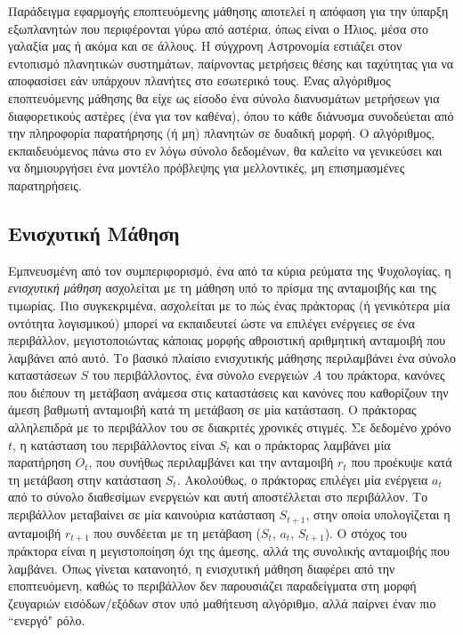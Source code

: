 Παράδειγμα εφαρμογής εποπτευόμενης μάθησης αποτελεί η απόφαση για την ύπαρξη εξωπλανητών που περιφέρονται γύρω από αστέρια, όπως είναι ο Ήλιος, μέσα στο γαλαξία μας ή ακόμα και σε άλλους. Η σύγχρονη Αστρονομία εστιάζει στον εντοπισμό πλανητικών συστημάτων, παίρνοντας μετρήσεις θέσης και ταχύτητας για να αποφασίσει εάν υπάρχουν πλανήτες στο εσωτερικό τους. Ένας αλγόριθμος εποπτευόμενης μάθησης θα είχε ως είσοδο ένα σύνολο διανυσμάτων μετρήσεων για διαφορετικούς αστέρες (ένα για τον καθένα), όπου το κάθε διάνυσμα συνοδεύεται από την πληροφορία παρατήρησης (ή μη) πλανητών σε δυαδική μορφή. Ο αλγόριθμος, εκπαιδευόμενος πάνω στο εν λόγω σύνολο δεδομένων, θα καλείτο να γενικεύσει και να δημιουργήσει ένα μοντέλο πρόβλεψης για μελλοντικές, μη επισημασμένες παρατηρήσεις.


\subsection{Ενισχυτική Μάθηση}
Εμπνευσμένη από τον συμπεριφορισμό, ένα από τα κύρια ρεύματα της Ψυχολογίας, η \emph{ενισχυτική μάθηση} ασχολείται με τη μάθηση υπό το πρίσμα της ανταμοιβής και της τιμωρίας. Πιο συγκεκριμένα, ασχολείται με το πώς ένας πράκτορας (ή γενικότερα μία οντότητα λογισμικού) μπορεί να εκπαιδευτεί ώστε να επιλέγει ενέργειες  σε ένα περιβάλλον, μεγιστοποιώντας κάποιας μορφής αθροιστική αριθμητική ανταμοιβή που λαμβάνει από αυτό. 
Το βασικό πλαίσιο ενισχυτικής μάθησης περιλαμβάνει ένα σύνολο καταστάσεων $S$ του περιβάλλοντος, ένα σύνολο ενεργειών $A$ του πράκτορα, κανόνες που διέπουν τη μετάβαση ανάμεσα στις καταστάσεις και κανόνες που καθορίζουν την άμεση βαθμωτή ανταμοιβή κατά τη μετάβαση σε μία κατάσταση. Ο πράκτορας αλληλεπιδρά με το περιβάλλον του σε διακριτές χρονικές στιγμές. Σε δεδομένο χρόνο $t$, η κατάσταση του περιβάλλοντος είναι $S_{t}$ και ο πράκτορας λαμβάνει μία παρατήρηση $O_{t}$, που συνήθως περιλαμβάνει και την ανταμοιβή $r_{t}$ που προέκυψε κατά τη μετάβαση στην κατάσταση $S_{t}$. Ακολούθως, ο πράκτορας επιλέγει μία ενέργεια $a_{t}$ από το σύνολο διαθεσίμων ενεργειών και αυτή αποστέλλεται στο περιβάλλον. Το περιβάλλον μεταβαίνει σε μία καινούρια κατάσταση $S_{t+1}$, στην οποία υπολογίζεται η ανταμοιβή $r_{t+1}$ που συνδέεται με τη μετάβαση ($S_{t}$, $a_{t}$, $S_{t+1}$). Ο στόχος του πράκτορα είναι η μεγιστοποίηση όχι της άμεσης, αλλά της συνολικής ανταμοιβής που λαμβάνει. Όπως γίνεται κατανοητό, η ενισχυτική μάθηση διαφέρει από την εποπτευόμενη, καθώς το περιβάλλον δεν παρουσιάζει παραδείγματα στη μορφή ζευγαριών εισόδων/εξόδων στον υπό μαθήτευση αλγόριθμο, αλλά παίρνει έναν πιο “ενεργό" ρόλο.


